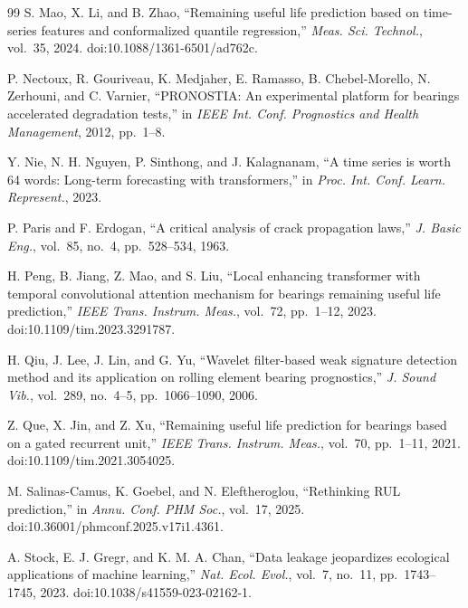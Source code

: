 \documentclass[pdflatex,sn-basic,NameDate]{sn-jnl}
\begin{document}
\begin{thebibliography}{99}
S. Mao, X. Li, and B. Zhao,
``Remaining useful life prediction based on time-series features and conformalized quantile regression,'' \textit{Meas. Sci. Technol.}, vol.~35, 2024. doi:10.1088/1361-6501/ad762c.

P. Nectoux, R. Gouriveau, K. Medjaher, E. Ramasso, B. Chebel-Morello, N. Zerhouni, and C. Varnier,
``PRONOSTIA: An experimental platform for bearings accelerated degradation tests,''
in \textit{IEEE Int. Conf. Prognostics and Health Management}, 2012, pp.~1--8.

Y. Nie, N. H. Nguyen, P. Sinthong, and J. Kalagnanam,
``A time series is worth 64 words: Long-term forecasting with transformers,''
in \textit{Proc. Int. Conf. Learn. Represent.}, 2023.

P. Paris and F. Erdogan,
``A critical analysis of crack propagation laws,''
\textit{J. Basic Eng.}, vol.~85, no.~4, pp.~528--534, 1963.

H. Peng, B. Jiang, Z. Mao, and S. Liu,
``Local enhancing transformer with temporal convolutional attention mechanism for bearings remaining useful life prediction,''
\textit{IEEE Trans. Instrum. Meas.}, vol.~72, pp.~1--12, 2023. doi:10.1109/tim.2023.3291787.

H. Qiu, J. Lee, J. Lin, and G. Yu,
``Wavelet filter-based weak signature detection method and its application on rolling element bearing prognostics,''
\textit{J. Sound Vib.}, vol.~289, no.~4--5, pp.~1066--1090, 2006.

Z. Que, X. Jin, and Z. Xu,
``Remaining useful life prediction for bearings based on a gated recurrent unit,''
\textit{IEEE Trans. Instrum. Meas.}, vol.~70, pp.~1--11, 2021. doi:10.1109/tim.2021.3054025.

M. Salinas-Camus, K. Goebel, and N. Eleftheroglou,
``Rethinking RUL prediction,'' in \textit{Annu. Conf. PHM Soc.}, vol.~17, 2025. doi:10.36001/phmconf.2025.v17i1.4361.

A. Stock, E. J. Gregr, and K. M. A. Chan,
``Data leakage jeopardizes ecological applications of machine learning,''
\textit{Nat. Ecol. Evol.}, vol.~7, no.~11, pp.~1743--1745, 2023. doi:10.1038/s41559-023-02162-1.


\end{thebibliography}
\end{document}

